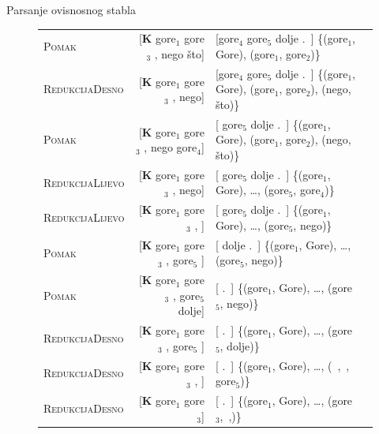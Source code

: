 \documentclass{beamer}
\begin{document}
\begin{frame}{Parsanje ovisnosnog stabla}
\begin{figure}
\begin{tabular}{l|rlm{4cm}}
    \textsc{Pomak}            & {[}\textbf{K} gore$_1$ gore$_3$ , nego što{]}       & {[}gore$_4$ gore$_5$ dolje .~{]}                                            \qquad \{(gore$_1$, Gore), (gore$_1$, gore$_2$)\}  \\
    \textsc{RedukcijaDesno}   & {[}\textbf{K} gore$_1$ gore$_3$ , nego{]}           & {[}gore$_4$ gore$_5$ dolje .~{]}                                            \qquad \{(gore$_1$, Gore), (gore$_1$, gore$_2$), (nego, što)\}  \\
    \textsc{Pomak}            & {[}\textbf{K} gore$_1$ gore$_3$ , nego gore$_4${]}  & {[} gore$_5$ dolje .~{]}                                                    \qquad \{(gore$_1$, Gore), (gore$_1$, gore$_2$), (nego, što)\}  \\
    \textsc{RedukcijaLijevo}  & {[}\textbf{K} gore$_1$ gore$_3$ , nego{]}           & {[} gore$_5$ dolje .~{]}                                                    \qquad \{(gore$_1$, Gore), \ldots, (gore$_5$, gore$_4$)\}  \\
    \textsc{RedukcijaLijevo}  & {[}\textbf{K} gore$_1$ gore$_3$ , {]}               & {[} gore$_5$ dolje .~{]}                                                    \qquad \{(gore$_1$, Gore), \ldots, (gore$_5$, nego)\}  \\
    \textsc{Pomak}            & {[}\textbf{K} gore$_1$ gore$_3$ , gore$_5$ {]}      & {[} dolje .~{]}                                                             \qquad \{(gore$_1$, Gore), \ldots, (gore$_5$, nego)\}  \\
    \textsc{Pomak}            & {[}\textbf{K} gore$_1$ gore$_3$ , gore$_5$ dolje{]} & {[} .~{]}                                                                   \qquad \{(gore$_1$, Gore), \ldots, (gore$_5$, nego)\}  \\
    \textsc{RedukcijaDesno}   & {[}\textbf{K} gore$_1$ gore$_3$ , gore$_5$ {]}      & {[} .~{]}                                                                   \qquad \{(gore$_1$, Gore), \ldots, (gore$_5$, dolje)\}  \\
    \textsc{RedukcijaDesno}   & {[}\textbf{K} gore$_1$ gore$_3$ , {]}               & {[} .~{]}                                                                   \qquad \{(gore$_1$, Gore), \ldots, (~,~, gore$_5$)\}  \\
    \textsc{RedukcijaDesno}   & {[}\textbf{K} gore$_1$ gore$_3${]}                  & {[} .~{]}                                                                   \qquad \{(gore$_1$, Gore), \ldots, (gore$_3$,~,)\}  \\

\end{tabular}
\end{figure}
\end{frame}
\end{document}
